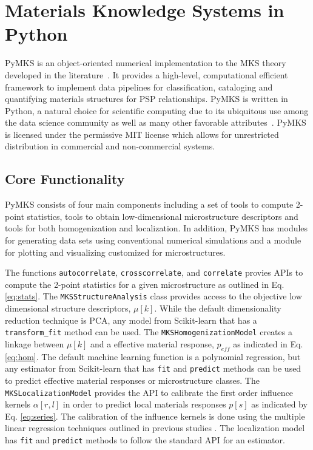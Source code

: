 \documentclass{bmcart}
\begin{document}
\section{Materials Knowledge Systems in Python}

PyMKS is an object-oriented numerical implementation to the MKS theory
developed in the literature~\cite{kalidindi2010novel}. It provides a
high-level, computational efficient framework to implement data
pipelines for classification, cataloging and quantifying materials
structures for PSP relationships. PyMKS is written in Python, a
natural choice for scientific computing due to its ubiquitous use
among the data science community as well as many other favorable
attributes~\cite{perez2011python}. PyMKS is licensed under the
permissive MIT license \cite{MIT} which allows for unrestricted
distribution in commercial and non-commercial systems.

\subsection{Core Functionality}

PyMKS consists of four main components including a set of tools to
compute 2-point statistics, tools to obtain low-dimensional
microstructure descriptors and tools for both homogenization and
localization. In addition, PyMKS has modules for generating data sets
using conventional numerical simulations and a module for plotting and
visualizing customized for microstructures.

The functions \texttt{autocorrelate}, \texttt{crosscorrelate}, and \texttt{correlate} provies APIs to compute the 2-point statistics for a given microstructure as outlined in Eq. \ref{eq:stats}. The \texttt{MKSStructureAnalysis} class provides access to the objective low dimensional structure descriptors, $\mu[k]$. While the default dimensionality reduction technique is PCA, any model from Scikit-learn that has a \texttt{transform\_fit} method can be used. The \texttt{MKSHomogenizationModel} creates a linkage between $\mu[k]$ and a effective material response, $p_{eff}$ as indicated in Eq. \ref{eq:hom}. The default machine learning function is a polynomial regression, but any estimator from Scikit-learn that has \texttt{fit} and \texttt{predict} methods can be used to predict effective material responses or microstructure classes. The \texttt{MKSLocalizationModel} provides the API to calibrate the first order influence kernels $\alpha[r, l]$ in order to predict local materials responses $p[s]$ as indicated by Eq. \ref{eq:series}. The calibration of the influence kernels is done using the multiple linear regression techniques outlined in previous studies \cite{landi2010multi, kalidindi2010novel, yabansu2014calibrated, brough2016microstructure}. The localization model has \texttt{fit} and \texttt{predict} methods to follow the standard API for an estimator.
\end{document}
